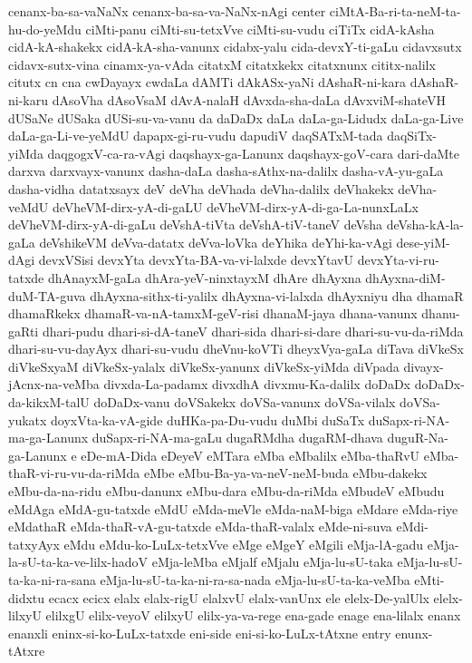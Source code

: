 {cenanx-ba-sa-vaNaNx
cenanx-ba-sa-va-NaNx-nAgi
center
ciMtA-Ba-ri-ta-neM-ta-hu-do-yeMdu
ciMti-panu
ciMti-su-tetxVve
ciMti-su-vudu
ciTiTx
cidA-kAsha
cidA-kA-shakekx
cidA-kA-sha-vanunx
cidabx-yalu
cida-devxY-ti-gaLu
cidavxsutx
cidavx-sutx-vina
cinamx-ya-vAda
citatxM
citatxkekx
citatxnunx
cititx-nalilx
citutx
cn
cna
cwDayayx
cwdaLa
dAMTi
dAkASx-yaNi
dAshaR-ni-kara
dAshaR-ni-karu
dAsoVha
dAsoVsaM
dAvA-nalaH
dAvxda-sha-daLa
dAvxviM-shateVH
dUSaNe
dUSaka
dUSi-su-va-vanu
da
daDaDx
daLa
daLa-ga-Lidudx
daLa-ga-Live
daLa-ga-Li-ve-yeMdU
dapapx-gi-ru-vudu
dapudiV
daqSATxM-tada
daqSiTx-yiMda
daqgogxV-ca-ra-vAgi
daqshayx-ga-Lanunx
daqshayx-goV-cara
dari-daMte
darxva
darxvayx-vanunx
dasha-daLa
dasha-sAthx-na-dalilx
dasha-vA-yu-gaLa
dasha-vidha
datatxsayx
deV
deVha
deVhada
deVha-dalilx
deVhakekx
deVha-veMdU
deVheVM-dirx-yA-di-gaLU
deVheVM-dirx-yA-di-ga-La-nunxLaLx
deVheVM-dirx-yA-di-gaLu
deVshA-tiVta
deVshA-tiV-taneV
deVsha
deVsha-kA-la-gaLa
deVshikeVM
deVva-datatx
deVva-loVka
deYhika
deYhi-ka-vAgi
dese-yiM-dAgi
devxVSisi
devxYta
devxYta-BA-va-vi-lalxde
devxYtavU
devxYta-vi-ru-tatxde
dhAnayxM-gaLa
dhAra-yeV-ninxtayxM
dhAre
dhAyxna
dhAyxna-diM-duM-TA-guva
dhAyxna-sithx-ti-yalilx
dhAyxna-vi-lalxda
dhAyxniyu
dha
dhamaR
dhamaRkekx
dhamaR-va-nA-tamxM-geV-risi
dhanaM-jaya
dhana-vanunx
dhanu-gaRti
dhari-pudu
dhari-si-dA-taneV
dhari-sida
dhari-si-dare
dhari-su-vu-da-riMda
dhari-su-vu-dayAyx
dhari-su-vudu
dheVnu-koVTi
dheyxVya-gaLa
diTava
diVkeSx
diVkeSxyaM
diVkeSx-yalalx
diVkeSx-yanunx
diVkeSx-yiMda
diVpada
divayx-jAcnx-na-veMba
divxda-La-padamx
divxdhA
divxmu-Ka-dalilx
doDaDx
doDaDx-da-kikxM-talU
doDaDx-vanu
doVSakekx
doVSa-vanunx
doVSa-vilalx
doVSa-yukatx
doyxVta-ka-vA-gide
duHKa-pa-Du-vudu
duMbi
duSaTx
duSapx-ri-NA-ma-ga-Lanunx
duSapx-ri-NA-ma-gaLu
dugaRMdha
dugaRM-dhava
duguR-Na-ga-Lanunx
e
eDe-mA-Dida
eDeyeV
eMTara
eMba
eMbalilx
eMba-thaRvU
eMba-thaR-vi-ru-vu-da-riMda
eMbe
eMbu-Ba-ya-va-neV-neM-buda
eMbu-dakekx
eMbu-da-na-ridu
eMbu-danunx
eMbu-dara
eMbu-da-riMda
eMbudeV
eMbudu
eMdAga
eMdA-gu-tatxde
eMdU
eMda-meVle
eMda-naM-biga
eMdare
eMda-riye
eMdathaR
eMda-thaR-vA-gu-tatxde
eMda-thaR-valalx
eMde-ni-suva
eMdi-tatxyAyx
eMdu
eMdu-ko-LuLx-tetxVve
eMge
eMgeY
eMgili
eMja-lA-gadu
eMja-la-sU-ta-ka-ve-lilx-hadoV
eMja-leMba
eMjalf
eMjalu
eMja-lu-sU-taka
eMja-lu-sU-ta-ka-ni-ra-sana
eMja-lu-sU-ta-ka-ni-ra-sa-nada
eMja-lu-sU-ta-ka-veMba
eMti-didxtu
ecacx
ecicx
elalx
elalx-rigU
elalxvU
elalx-vanUnx
ele
elelx-De-yalUlx
elelx-lilxyU
elilxgU
elilx-veyoV
elilxyU
elilx-ya-va-rege
ena-gade
enage
ena-lilalx
enanx
enanxli
eninx-si-ko-LuLx-tatxde
eni-side
eni-si-ko-LuLx-tAtxne
entry
enunx-tAtxre
}
